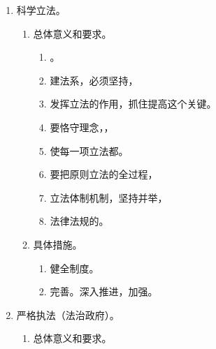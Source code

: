 \begin{enumerate}
\begin{enumerate}
{                  都是没有任何问题的}。
                总之，可以虚实结合！
          \item 5 连鞭有没有重点呢，
                当然有，
                法治社会部分，
                也就是守法这一环节，是绝对的，超级重点，
                无论是“我国不能成为诉讼大国”，
                还是“枫桥经验”等新提法和新指示，
                都直接关联这个部分，
                所以要求法治社会，
                全部背诵！
                有困难，克服即可，这个没得商量！
        \end{enumerate}
  \item 科学立法。
        \begin{enumerate}
          \item 总体意义和要求。
                \begin{enumerate}
                  \item {}。
                  \item 建法系，必须坚持，
                  \item 发挥立法的作用，抓住提高这个关键。
                  \item 要恪守理念，，
                  \item 使每一项立法都。
                  \item 要把原则立法的全过程，
                  \item {}立法体制机制，坚持并举，
                  \item {}法律法规的。
                \end{enumerate}
          \item 具体措施。
                \begin{enumerate}
                  \item 健全制度。
                  \item 完善。深入推进，加强。
                \end{enumerate}
        \end{enumerate}
  \item 严格执法（法治政府）。
        \begin{enumerate}
          \item 总体意义和要求。
                \begin{enumerate}

\end{enumerate}
\end{enumerate}
\end{enumerate}
